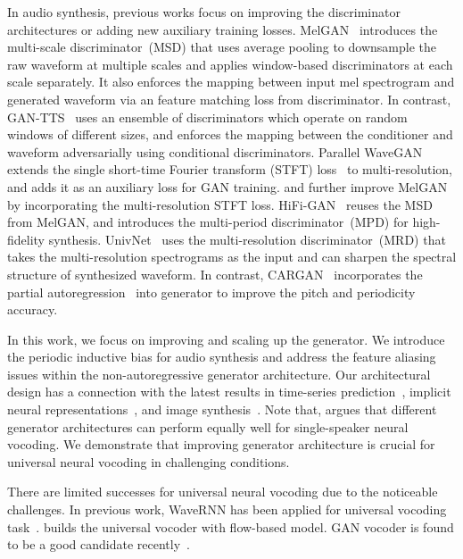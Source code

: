 \documentclass{article} \usepackage{iclr2023_conference,times}
\theoremstyle{plain}
\theoremstyle{definition}
\theoremstyle{remark}
\begin{document}
In audio synthesis, previous works focus on improving the discriminator architectures or adding new auxiliary training losses.
MelGAN~\citep{kumar2019melgan} introduces the multi-scale discriminator~(MSD) that uses average pooling to downsample the raw waveform at multiple scales and applies window-based discriminators at each scale separately. It also enforces the mapping between input mel spectrogram and generated waveform via an  feature matching loss from discriminator.
In contrast, GAN-TTS~\citep{binkowski2020high} uses an ensemble of discriminators which operate on random windows of different sizes, and enforces the mapping between the conditioner and waveform adversarially using conditional discriminators.
Parallel WaveGAN~\citep{yamamoto2020parallel} extends the single short-time Fourier transform (STFT) loss~\citep{ping2018clarinet} to multi-resolution, and adds it as an auxiliary loss for GAN training.
\cite{yang2021multi} and \cite{mustafa2021stylemelgan} further improve MelGAN by incorporating the multi-resolution STFT loss.
HiFi-GAN~\citep{kong2020hifi} reuses the MSD from MelGAN, and introduces the multi-period discriminator~(MPD) for high-fidelity synthesis. 
UnivNet~\citep{jang2020universal, jang2021univnet} uses the multi-resolution discriminator~(MRD) that takes the multi-resolution spectrograms as the input and can sharpen the spectral structure of synthesized waveform.
In contrast, CARGAN~\citep{morrison2021chunked} incorporates the partial autoregression~\citep{ping2019waveflow} into generator to improve the pitch and periodicity accuracy.

In this work, we focus on improving and scaling up the generator. We introduce the periodic inductive bias for audio synthesis and address the feature aliasing issues within the non-autoregressive generator architecture. Our architectural design  has a connection with the latest results in time-series prediction~\citep{liu2020neural}, {implicit neural representations~\citep{sitzmann2020implicit}}, and image synthesis~\citep{karras2021alias}.
Note that, \citet{you2021gan} argues that different generator architectures can perform equally well for single-speaker neural vocoding.
We demonstrate that improving generator architecture is  crucial for universal neural vocoding in challenging conditions.


There are limited successes for universal neural vocoding due to the noticeable challenges.
In previous work, WaveRNN has been applied for universal vocoding task~\citep{lorenzo2018towards, paul2020speaker}. \citet{jiao2021universal} builds the  universal vocoder with flow-based model.
GAN vocoder is found to be a good candidate recently~\citep{jang2021univnet}.
\end{document}
